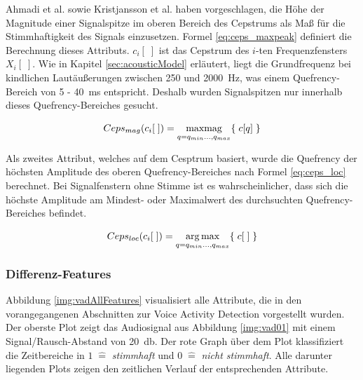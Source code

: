 Ahmadi et al. \cite{vad_ceps} sowie Kristjansson et al.\cite{vad_Lisboa} haben vorgeschlagen, die Höhe der Magnitude einer Signalspitze im oberen Bereich des Cepstrums als Maß für die Stimmhaftigkeit des Signals einzusetzen. Formel \ref{eq:ceps_maxpeak} definiert die Berechnung dieses Attributs. $c_i[\;]$ ist das Cepstrum des $i$-ten Frequenzfensters $X_i[\;]$. Wie in Kapitel \ref{sec:acousticModel} erläutert, liegt die Grundfrequenz bei kindlichen Lautäußerungen zwischen 250 und \SI{2000}{\hertz}, was einem Quefrency-Bereich von 5 - \SI{40}{\milli\second} entspricht. Deshalb wurden Signalspitzen nur innerhalb dieses Quefrency-Bereiches gesucht.

\begin{equation}
Ceps_{mag}(c_i[\;]) = \operatorname*{max mag}_{q = q_{min} \ldots , q_{max}}\{ \; c[q] \; \}
\label{eq:ceps_maxpeak}
\end{equation}

Als zweites Attribut, welches auf dem Cesptrum basiert, wurde die Quefrency der höchsten Amplitude des oberen Quefrency-Bereiches nach Formel \ref{eq:ceps_loc} berechnet. Bei Signalfenstern ohne Stimme ist es wahrscheinlicher, dass sich die höchste Amplitude am Mindest- oder Maximalwert des durchsuchten Quefrency-Bereiches befindet.

\begin{equation}
Ceps_{loc}(c_i[\;]) = \operatorname*{arg\,max}_{q = q_{min} \ldots , q_{max}} \{ \; c[\;] \; \}
\label{eq:ceps_loc}
\end{equation}	

\subsubsection{Differenz-Features}
\label{sec:vad_dif_feature}

Abbildung \ref{img:vadAllFeatures} visualisiert alle Attribute, die in den vorangegangenen Abschnitten zur Voice Activity Detection vorgestellt wurden. Der oberste Plot zeigt das Audiosignal aus Abbildung \ref{img:vad01} mit einem Signal/Rausch-Abstand von \SI{20}{\decibel}. Der rote Graph über dem Plot klassifiziert die Zeitbereiche in $1 \; \hat{=} $ \emph{stimmhaft} und $0 \; \hat{=}$ \emph{nicht stimmhaft}. Alle darunter liegenden Plots zeigen den zeitlichen Verlauf der entsprechenden Attribute.

